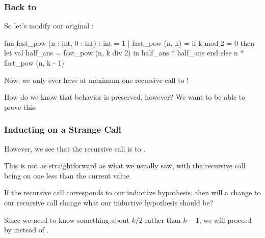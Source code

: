 \documentclass[aspectratio=169]{beamer}
\begin{document}
\begin{frame}[fragile]
  \frametitle{Back to }

  So let's modify our original :

  \pause

  { \small
  \begin{codeblock}
    fun fast_pow (n : int, 0 : int) : int = 1
      | fast_pow (n, k) =
          if k mod 2 = 0 then
            let
              val half_ans = fast_pow (n, k div 2)
            in
              half_ans * half_ans
            end
          else
            n * fast_pow (n, k - 1)
  \end{codeblock}
  }

  Now, we only ever have at maximum one recursive call to !

  \pause
  \vspace{\fill}

  How do we know that behavior is preserved, however? We want to be able to
  prove this.
\end{frame}

\begin{frame}[fragile]
  \frametitle{Inducting on a Strange Call}

  However, we see that the recursive call is to .

  \pause
  \vspace{\fill}

  This is not as straightforward as what we usually saw, with the recursive
  call being on one less than the current value.

  \pause
  \vspace{\fill}

  If the recursive call corresponds to our inductive hypothesis, then will
  a change to our recursive call change what our inductive hypothesis
  should be?

  \pause
  \vspace{\fill}


  \pause
  \vspace{\fill}

  Since we need to know something about $k/2$ rather than $k - 1$, we will
  proceed by  instead of .
\end{frame}
\end{document}
